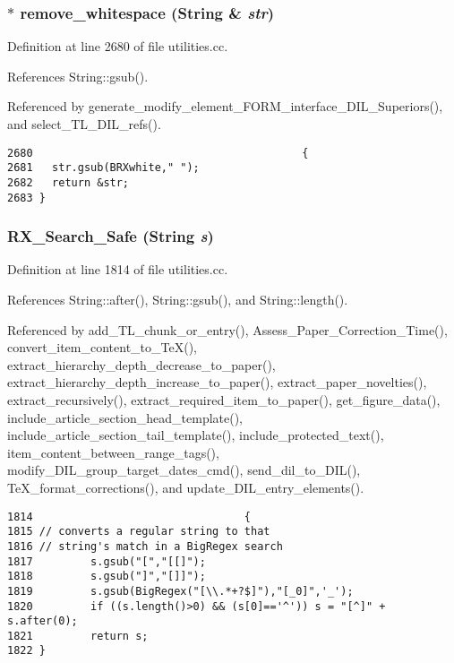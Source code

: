 \subsubsection{$\ast$ remove\_\-whitespace ({\bf String} \& {\em str})}\label{dil2al_8hh_a280}




Definition at line 2680 of file utilities.cc.

References String::gsub().

Referenced by generate\_\-modify\_\-element\_\-FORM\_\-interface\_\-DIL\_\-Superiors(), and select\_\-TL\_\-DIL\_\-refs().



\footnotesize\begin{verbatim}2680                                          {
2681   str.gsub(BRXwhite," ");
2682   return &str;
2683 }
\end{verbatim}\normalsize 
{}
\subsubsection{ RX\_\-Search\_\-Safe ({\bf String} {\em s})}\label{dil2al_8hh_a216}




Definition at line 1814 of file utilities.cc.

References String::after(), String::gsub(), and String::length().

Referenced by add\_\-TL\_\-chunk\_\-or\_\-entry(), Assess\_\-Paper\_\-Correction\_\-Time(), convert\_\-item\_\-content\_\-to\_\-Te\-X(), extract\_\-hierarchy\_\-depth\_\-decrease\_\-to\_\-paper(), extract\_\-hierarchy\_\-depth\_\-increase\_\-to\_\-paper(), extract\_\-paper\_\-novelties(), extract\_\-recursively(), extract\_\-required\_\-item\_\-to\_\-paper(), get\_\-figure\_\-data(), include\_\-article\_\-section\_\-head\_\-template(), include\_\-article\_\-section\_\-tail\_\-template(), include\_\-protected\_\-text(), item\_\-content\_\-between\_\-range\_\-tags(), modify\_\-DIL\_\-group\_\-target\_\-dates\_\-cmd(), send\_\-dil\_\-to\_\-DIL(), Te\-X\_\-format\_\-corrections(), and update\_\-DIL\_\-entry\_\-elements().



\footnotesize\begin{verbatim}1814                                 {
1815 // converts a regular string to that
1816 // string's match in a BigRegex search
1817         s.gsub("[","[[]");
1818         s.gsub("]","[]]");
1819         s.gsub(BigRegex("[\\.*+?$]"),"[_0]",'_');
1820         if ((s.length()>0) && (s[0]=='^')) s = "[^]" + s.after(0);
1821         return s;
1822 }
\end{verbatim}\normalsize 
{}
